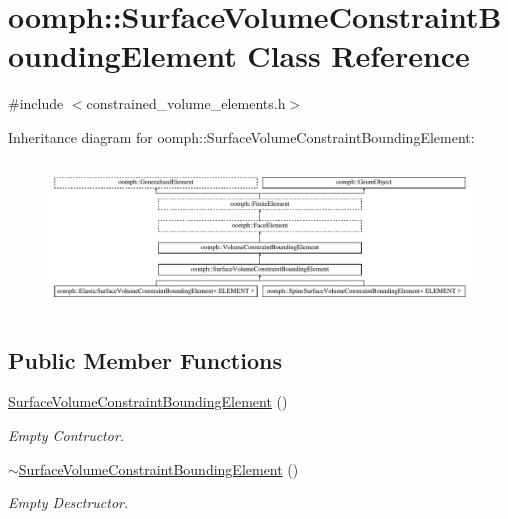 \hypertarget{classoomph_1_1SurfaceVolumeConstraintBoundingElement}{}\section{oomph\+:\+:Surface\+Volume\+Constraint\+Bounding\+Element Class Reference}
\label{classoomph_1_1SurfaceVolumeConstraintBoundingElement}


{\ttfamily \#include $<$constrained\+\_\+volume\+\_\+elements.\+h$>$}

Inheritance diagram for oomph\+:\+:Surface\+Volume\+Constraint\+Bounding\+Element\+:\begin{figure}[H]
\begin{center}
\leavevmode
\includegraphics[height=3.971631cm]{classoomph_1_1SurfaceVolumeConstraintBoundingElement}
\end{center}
\end{figure}
\subsection*{Public Member Functions}
\begin{DoxyCompactItemize}
\item 
\hyperlink{classoomph_1_1SurfaceVolumeConstraintBoundingElement_a1dc9bb792bbce8f69f063a33934fc84e}{Surface\+Volume\+Constraint\+Bounding\+Element} ()
\begin{DoxyCompactList}\small\item\em Empty Contructor. \end{DoxyCompactList}\item 
\hyperlink{classoomph_1_1SurfaceVolumeConstraintBoundingElement_a9545195abf877c791208081022f30672}{$\sim$\+Surface\+Volume\+Constraint\+Bounding\+Element} ()
\begin{DoxyCompactList}\small\item\em Empty Desctructor. \end{DoxyCompactList}\end{DoxyCompactItemize}
